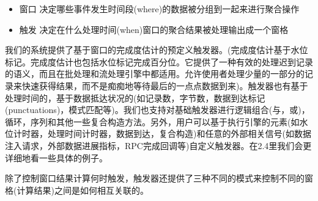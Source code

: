 \documentclass[oneside]{ctexbook}
\begin{document}
\begin{itemize}
\item 窗口 决定哪些事件发生时间段(where)的数据被分组到一起来进行聚合操作
\item 触发 决定在什么处理时间(when)窗口的聚合结果被处理输出成一个窗格
\end{itemize}
我们的系统提供了基于窗口的完成度估计的预定义触发器。(完成度估计基于水位标记。完成度估计也包括水位标记完成百分位。它提供了一种有效的处理迟到记录的语义，而且在批处理和流处理引擎中都适用。允许使用者处理少量的一部分的记录来快速获得结果，而不是痴痴地等待最后的一点点数据到来)。触发器也有基于处理时间的，基于数据抵达状况的(如记录数，字节数，数据到达标记(punctuations)，模式匹配等)。我们也支持对基础触发器进行逻辑组合(与，或)，循环，序列和其他一些复合构造方法。另外，用户可以基于执行引擎的元素(如水位计时器，处理时间计时器，数据到达，复合构造)和任意的外部相关信号(如数据注入请求，外部数据进展指标，RPC完成回调等)自定义触发器。在2.4里我们会更详细地看一些具体的例子。

除了控制窗口结果计算何时触发，触发器还提供了三种不同的模式来控制不同的窗格(计算结果)之间是如何相互关联的。
\end{document}

